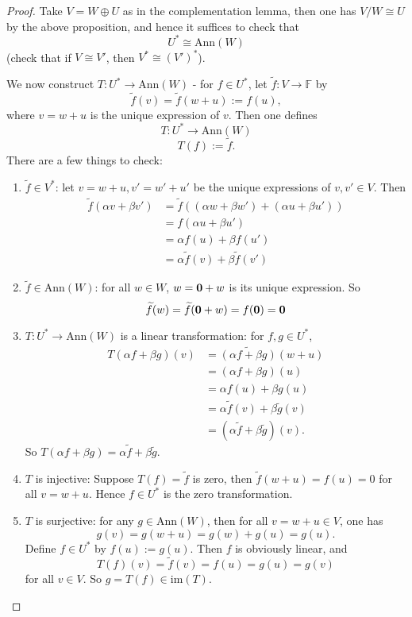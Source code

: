 \documentclass[11pt,openany]{book}
\theoremstyle{plain}
\theoremstyle{definition}
\theoremstyle{remark}
\begin{document}
\begin{proof}
    Take $V = W \oplus U$ as in the complementation lemma, then one has $V/W \cong U$ by the above proposition, and hence it suffices to check that
    $$U^* \cong \mathrm{Ann}(W)$$
    (check that if $V \cong V'$, then $V^* \cong (V')^*$). 

    We now construct $T: U^* \to \mathrm{Ann}(W)$ - for $f \in U^*$, let
    $\widetilde{f}: V \to \mathbb{F}$ by
    $$\widetilde{f}(v) = \widetilde{f}(w+u) := f(u),$$
    where $v = w +u$ is the unique expression of $v$. Then one defines
$$T: U^* \to \mathrm{Ann}(W)$$
    $$T(f) := \widetilde{f}.$$
    There are a few things to check:
    \begin{enumerate}
        \item $\widetilde{f} \in V^*$: let $v = w + u, v' = w' + u'$ be the unique expressions of $v, v' \in V$. Then        
        \begin{align*}
        \widetilde{f}(\alpha v + \beta v') &= \widetilde{f}((\alpha w + \beta w') + (\alpha u + \beta u'))\\ &= f(\alpha u + \beta u')\\ &= \alpha f(u) + \beta f(u')\\ &= \alpha \widetilde{f}(v) + \beta \widetilde{f}(v') \end{align*}
        \item $\widetilde{f} \in \mathrm{Ann}(W)$: for all $w \in W$, $w = {\bf 0} + w$ is its unique expression. So
        $$\widetilde{f}(w) = \widetilde{f}({\bf 0} + w) = f(\bf 0) = 0$$
        \item $T: U^* \to \mathrm{Ann}(W)$ is a linear transformation: for  $f, g \in U^*$, 
        \begin{align*}
        T(\alpha f+ \beta g)(v) &= \widetilde{(\alpha f+ \beta g)}(w+u)\\ 
        &= (\alpha f+ \beta g)(u)\\  &= \alpha f(u)+ \beta g(u) \\
        &= \alpha \widetilde{f}(v)+ \beta \widetilde{g}(v) \\
        &= (\alpha \widetilde{f}+ \beta \widetilde{g})(v). \end{align*}
        So $T(\alpha f+ \beta g) = \alpha \widetilde{f}+ \beta \widetilde{g}$.

        \item $T$ is injective: Suppose $T(f) = \widetilde{f}$ is zero, then
        $\widetilde{f}(w+u) = f(u) = 0$ for all $v = w + u$. Hence $f \in U^*$ is the zero transformation.

        \item $T$ is surjective: for any $g \in \mathrm{Ann}(W)$, then for all $v = w + u \in V$, one has
         $$g(v) = g(w+u) = g(w)+g(u) = g(u).$$
        Define $f \in U^*$ by $f(u) := g(u)$. Then $f$ is obviously linear, and 
        $$T(f)(v) = \widetilde{f}(v) = f(u) = g(u) = g(v)$$
        for all $v \in V$. So $g = T(f) \in \mathrm{im}(T)$.
    \end{enumerate}
\end{proof}
\end{document}
